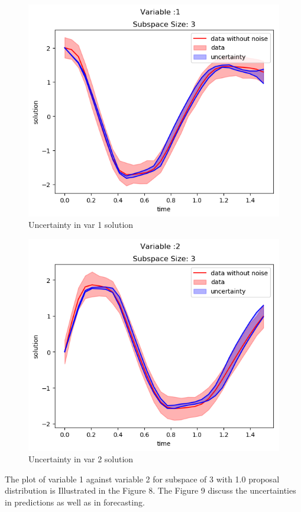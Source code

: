 \documentclass[12pt,a4paper]{article}
\begin{document}
\begin{figure}
\centering
\includegraphics{img/inference_var1.png}
\caption{Uncertainty in var 1 solution}
\end{figure}
 \begin{figure}
\centering
\includegraphics{img/inference_var2.png}
\caption{Uncertainty in var 2 solution}
\end{figure}


The plot of variable 1 against variable 2 for subspace of 3 with 1.0 proposal distribution is Illustrated  in the Figure 8. The Figure 9 discuss the uncertainties in predictions as well as in forecasting.
\end{document}
